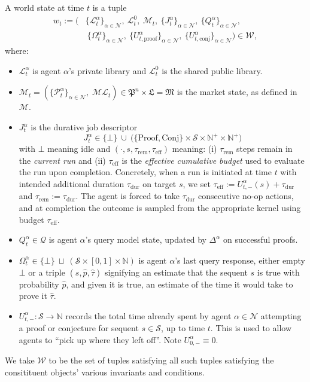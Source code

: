 A world state at time $t$ is a tuple
\begin{align*}
w_t :=
\Big(
&\{\mathcal{L}^\alpha_t\}_{\alpha\in\mathcal{N}},
\ \mathcal{L}^0_t,
\ \mathcal{M}_t,
\ \{J^\alpha_t\}_{\alpha\in\mathcal{N}},
\ \{Q^\alpha_t\}_{\alpha\in\mathcal{N}},
\\&\ \{\Omega^\alpha_t\}_{\alpha\in\mathcal{N}},
\ \{U_{t,\mathrm{proof}}^\alpha\}_{\alpha\in\mathcal N},
\ \{U_{t,\mathrm{conj}}^\alpha\}_{\alpha\in\mathcal N}
\Big)\in\mathcal{W},
\end{align*}
where:
\begin{itemize}
\item $\mathcal{L}^\alpha_t$ is agent $\alpha$'s private library and
$\mathcal{L}^0_t$ is the shared public library.
\item $\mathcal{M}_t=(\{\mathcal{P}^\alpha_t\}_{\alpha\in\mathcal{N}},\;\mathcal{ML}_t) \in \mathfrak{P}^n \times \mathfrak{L} =\mathfrak{M}$ is the market state, as defined in $\mathscr{M}$.
\item $J^\alpha_t$ is the durative job descriptor
\[
J^\alpha_t \in \{\bot\}\ \cup\ \big(\{\mathrm{Proof}, \mathrm{Conj}\}\times\mathcal{S}\times\mathbb{N}^+\times\mathbb{N}^+\big)
\]
with $\bot$ meaning idle and $(\cdot,s,\tau_{\mathrm{rem}},\tau_{\mathrm{eff}})$ meaning:
(i) $\tau_{\mathrm{rem}}$ steps remain in the \emph{current run} and
(ii) $\tau_{\mathrm{eff}}$ is the \emph{effective cumulative budget} used to evaluate the run upon completion.
Concretely, when a run is initiated at time $t$ with intended additional duration $\tau_{\mathrm{dur}}$ on target $s$,
we set $\tau_{\mathrm{eff}} := U^\alpha_{t,\mathrm{-}}(s) + \tau_{\mathrm{dur}}$ and $\tau_{\mathrm{rem}} := \tau_{\mathrm{dur}}$.
The agent is forced to take $\tau_{\mathrm{dur}}$ consecutive no-op actions, and at completion the outcome is sampled from the
appropriate kernel using budget $\tau_{\mathrm{eff}}$.
\item $Q^\alpha_t\in\mathcal{Q}$ is agent $\alpha$'s query model state, updated by $\Delta^\alpha$ on successful proofs.
\item  $\Omega^\alpha_t \in \{\bot\}\ \sqcup\ (\mathcal{S}\times[0,1]\times\mathbb{N})$ is agent $\alpha$'s last query response, either empty $\bot$ or a triple $(s,\hat p,\hat \tau)$ signifying an estimate that the sequent $s$ is true with probability $\hat p$, and given it is true, an estimate of the time it would take to prove it $\hat \tau$.
\item $U^\alpha_{t,\mathrm{-}} : \mathcal S \to \mathbb N$ records the total time already spent by agent $\alpha \in \mathcal N$ attempting a proof or conjecture for sequent $s \in \mathcal S$, up to time $t$. This is used to allow agents to ``pick up where they left off''. Note $U^\alpha_{0,\mathrm{-}}\equiv 0$.
\end{itemize}
We take $\mathcal{W}$ to be the set of tuples satisfying all such tuples satisfying the consitituent objects' various invariants and conditions.


